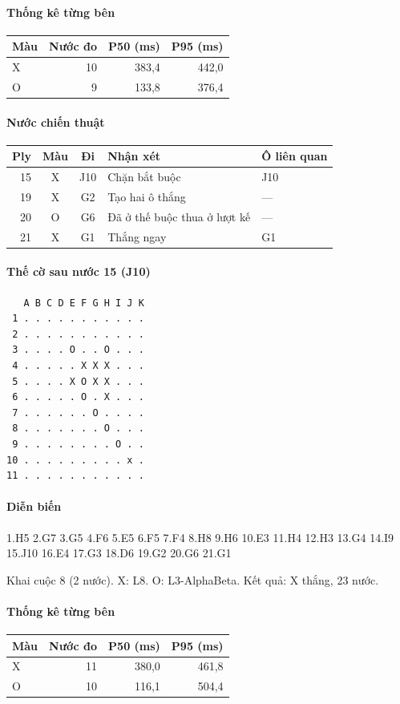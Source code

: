 \paragraph{Thống kê từng bên}
\begin{center}\small
\begin{tabular}{@{}lrrr@{}}
\toprule
Màu & Nước đo & P50 (ms) & P95 (ms) \\
\midrule
X & 10 & 383,4 & 442,0 \\
O & 9 & 133,8 & 376,4 \\
\bottomrule
\end{tabular}
\end{center}
\paragraph{Nước chiến thuật}
\begin{center}\small
\begin{tabular}{@{}rccll@{}}
\toprule
Ply & Màu & Đi & Nhận xét & Ô liên quan \\
\midrule
15 & X & J10 & Chặn bắt buộc & J10 \\
19 & X & G2 & Tạo hai ô thắng & — \\
20 & O & G6 & Đã ở thế buộc thua ở lượt kế & — \\
21 & X & G1 & Thắng ngay & G1 \\
\bottomrule
\end{tabular}
\end{center}
\paragraph{Thế cờ sau nước 15 (J10)}
\begin{verbatim}
   A B C D E F G H I J K
 1 . . . . . . . . . . .
 2 . . . . . . . . . . .
 3 . . . . O . . O . . .
 4 . . . . . X X X . . .
 5 . . . . X O X X . . .
 6 . . . . . O . X . . .
 7 . . . . . . O . . . .
 8 . . . . . . . O . . .
 9 . . . . . . . . O . .
10 . . . . . . . . . x .
11 . . . . . . . . . . .
\end{verbatim}
\paragraph{Diễn biến}
{\footnotesize 1.H5 2.G7 3.G5 4.F6 5.E5 6.F5 7.F4 8.H8 9.H6 10.E3 11.H4 12.H3 13.G4 14.I9 15.J10 16.E4 17.G3 18.D6 19.G2 20.G6 21.G1\par}
Khai cuộc 8 (2 nước). X: L8. O: L3-AlphaBeta. Kết quả: X thắng, 23 nước.
\paragraph{Thống kê từng bên}
\begin{center}\small
\begin{tabular}{@{}lrrr@{}}
\toprule
Màu & Nước đo & P50 (ms) & P95 (ms) \\
\midrule
X & 11 & 380,0 & 461,8 \\
O & 10 & 116,1 & 504,4 \\
\bottomrule
\end{tabular}
\end{center}
